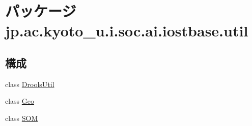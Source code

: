 \hypertarget{namespacejp_1_1ac_1_1kyoto__u_1_1i_1_1soc_1_1ai_1_1iostbase_1_1util}{\section{パッケージ jp.\-ac.\-kyoto\-\_\-u.\-i.\-soc.\-ai.\-iostbase.\-util}
\label{namespacejp_1_1ac_1_1kyoto__u_1_1i_1_1soc_1_1ai_1_1iostbase_1_1util}
}
\subsection*{構成}
\begin{DoxyCompactItemize}
\item 
class \hyperlink{classjp_1_1ac_1_1kyoto__u_1_1i_1_1soc_1_1ai_1_1iostbase_1_1util_1_1_drools_util}{Drools\-Util}
\item 
class \hyperlink{classjp_1_1ac_1_1kyoto__u_1_1i_1_1soc_1_1ai_1_1iostbase_1_1util_1_1_geo}{Geo}
\item 
class \hyperlink{classjp_1_1ac_1_1kyoto__u_1_1i_1_1soc_1_1ai_1_1iostbase_1_1util_1_1_s_o_m}{S\-O\-M}
\end{DoxyCompactItemize}
